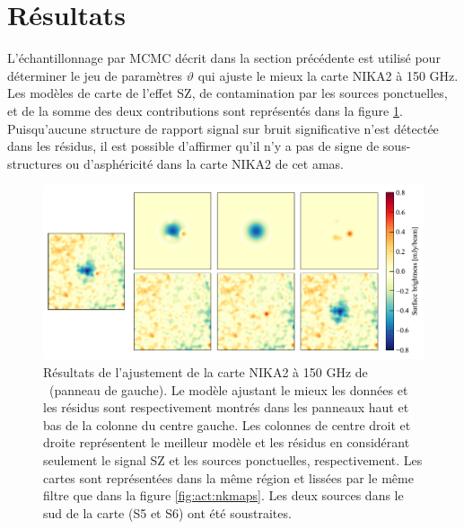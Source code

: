\section{Résultats}

L'échantillonnage par MCMC décrit dans la section précédente est utilisé pour déterminer le jeu de paramètres $\vartheta$ qui ajuste le mieux la carte NIKA2 à 150 GHz.
Les modèles de carte de l'effet SZ, de contamination par les sources ponctuelles, et de la somme des deux contributions sont représentés dans la figure \ref{fig:act:dmr}.
Puisqu'aucune structure de rapport signal sur bruit significative n'est détectée dans les résidus, il est possible d'affirmer qu'il n'y a pas de signe de sous-structures ou d'asphéricité dans la carte NIKA2 de cet amas.

\begin{figure}[t]
    \begin{center}
    \includegraphics[width=.95\linewidth]{Figures/Chap_actj0215/dat_mod_res_full.pdf}
    \caption{%
        Résultats de l'ajustement de la carte NIKA2 à 150 GHz de \act\ (panneau de gauche).
        Le modèle ajustant le mieux les données et les résidus sont respectivement montrés dans les panneaux haut et bas de la colonne du centre gauche.
        Les colonnes de centre droit et droite représentent le meilleur modèle et les résidus en considérant seulement le signal SZ et les sources ponctuelles, respectivement.
        Les cartes sont représentées dans la même région et lissées par le même filtre que dans la figure \ref{fig:act:nkmaps}.
        Les deux sources dans le sud de la carte (S5 et S6) ont été soustraites.
        }
        \label{fig:act:dmr}
    \end{center}
\end{figure}

